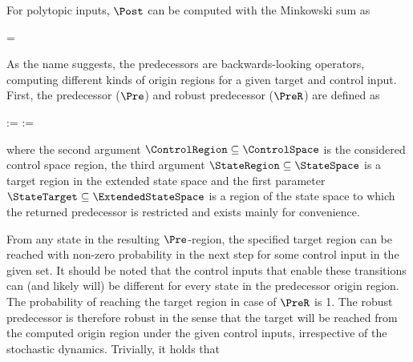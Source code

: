     For polytopic inputs, $\Post$ can be computed with the Minkowski sum as

    \startformula
         = \MatA \StateRegion \oplus \MatB \ControlRegion \oplus \RandomSpace \EndPeriod
    \stopformula

\stopsection


\startsubsection[title={Predecessors}]

    As the name suggests, the predecessors are backwards-looking operators, computing different kinds of origin regions for a given target and control input.
    First, the predecessor ($\Pre$) and robust predecessor ($\PreR$) are defined as

    \startformula
        \startalign[n=2,align={right,left}]
            \NC {} :=
            \NC {} \EndAnd
            \NR
            \NC {} :=
            \NC {} \EndComma
            \NR
        \stopalign
    \stopformula

    where the second argument $\ControlRegion \subseteq \ControlSpace$ is the considered control space region, the third argument $\StateRegion \subseteq \StateSpace$ is a target region in the extended state space and the first parameter $\StateTarget \subseteq \ExtendedStateSpace$ is a region of the state space to which the returned predecessor is restricted and exists mainly for convenience.

    From any state in the resulting $\Pre$-region, the specified target region can be reached with non-zero probability in the next step for some control input in the given set.
    It should be noted that the control inputs that enable these transitions can (and likely will) be different for every state in the predecessor origin region.
    The probability of reaching the target region in case of $\PreR$ is 1.
    The robust predecessor is therefore robust in the sense that the target will be reached from the computed origin region under the given control inputs, irrespective of the stochastic dynamics.
    Trivially, it holds that

    \startformula
         \subseteq {} \EndPeriod
    \stopformula


